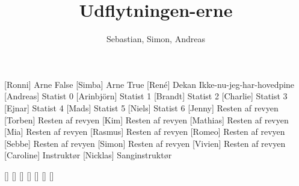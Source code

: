 \documentclass[a4paper,11pt]{article}
\title{Udflytningen-erne}
\author{Sebastian, Simon, Andreas}
\begin{document}
\maketitle

\begin{roles}
[Ronni] Arne False
[Simba] Arne True
[René] Dekan Ikke-nu-jeg-har-hovedpine
[Andreas] Statist 0
[Arinbjörn] Statist 1
[Brandt] Statist 2
[Charlie] Statist 3
[Ejnar] Statist 4
[Mads] Statist 5
[Niels] Statist 6
[Jenny] Resten af revyen
[Torben] Resten af revyen
[Kim] Resten af revyen
[Mathias] Resten af revyen
[Mia] Resten af revyen
[Rasmus] Resten af revyen
[Romeo] Resten af revyen
[Sebbe] Resten af revyen
[Simon] Resten af revyen
[Vivien] Resten af revyen
[Caroline] Instruktør
[Nicklas] Sanginstruktør
\end{roles}

\begin{props}
    []
    []
    []
    []
    []
    []
    []
\end{props}
\end{document}

